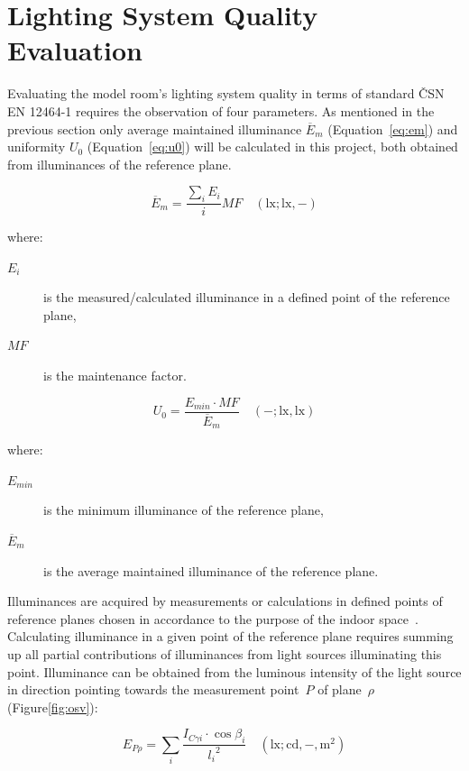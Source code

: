 \section{Lighting System Quality Evaluation}
Evaluating the model room's lighting system quality in terms of standard \v{C}SN EN 12464-1\cite{12464} requires the observation of four parameters. As mentioned in the previous section only average maintained illuminance $\overline{E}_{m}$ (Equation~\ref{eq:em}) and uniformity $U_{0}$ (Equation~\ref{eq:u0}) will be calculated in this project, both obtained from illuminances of the reference plane.

\begin{equation}
\overline{E}_{m}=\frac{\sum_{i} E_{i}}{i}MF \quad \mathrm{(lx;lx,-)}
\label{eq:em}
\end{equation}

\noindent where:
\begin{description}
	\item[$E_{i}$] is the measured/calculated illuminance in a defined point of the reference plane,
	\item[$MF$] is the maintenance factor.
\end{description}

\begin{equation}
U_{0}=\frac{E_{min}\cdot MF}{\overline{E}_{m}} \quad \mathrm{(-;lx,lx)}
\label{eq:u0}
\end{equation}

\noindent where:
\begin{description}
	\item[$E_{min}$] is the minimum illuminance of the reference plane,
	\item[$\overline{E}_{m}$] is the average maintained illuminance of the reference plane.
\end{description}

Illuminances are acquired by measurements or calculations in defined points of reference planes chosen in accordance to the purpose of the indoor space~\cite{12464}. Calculating illuminance in a given point of the reference plane requires summing up all partial contributions of illuminances from light sources illuminating this point. Illuminance can be obtained from the luminous intensity of the light source in direction pointing towards the measurement point~$P$ of plane~$\rho$ (Figure\ref{fig:osv}):

\begin{equation}
E_{P\rho}=\sum_{i} \frac{I_{C \gamma i} \cdot \cos{\beta_{i}}}{{l_{i}}^{2}} \quad \mathrm{(lx;cd,-,m^{2})}
\label{eq:illSum}
\end{equation}

